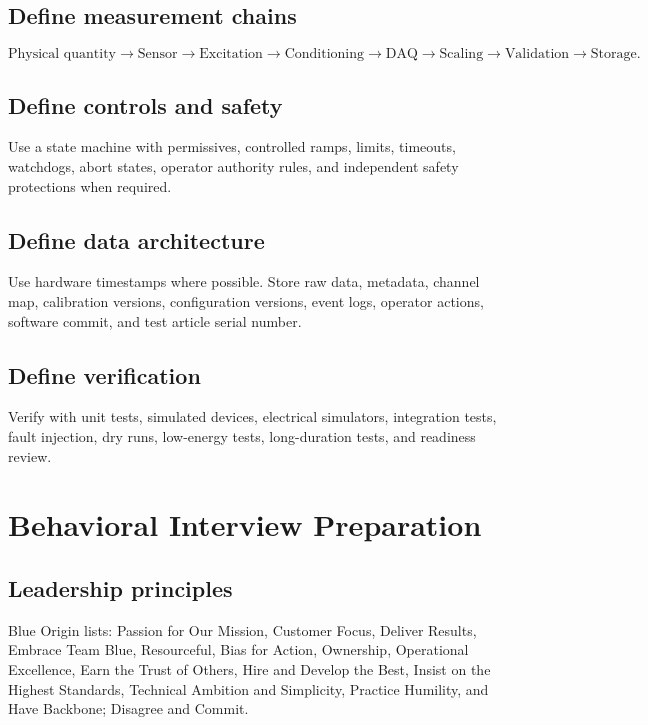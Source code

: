 \documentclass[11pt]{article}
\begin{document}
\subsection{Define measurement chains}
\[
\text{Physical quantity}\rightarrow\text{Sensor}\rightarrow\text{Excitation}
\rightarrow\text{Conditioning}\rightarrow\text{DAQ}\rightarrow
\text{Scaling}\rightarrow\text{Validation}\rightarrow\text{Storage}.
\]

\subsection{Define controls and safety}
Use a state machine with permissives, controlled ramps, limits, timeouts,
watchdogs, abort states, operator authority rules, and independent safety
protections when required.

\subsection{Define data architecture}
Use hardware timestamps where possible. Store raw data, metadata, channel map,
calibration versions, configuration versions, event logs, operator actions,
software commit, and test article serial number.

\subsection{Define verification}
Verify with unit tests, simulated devices, electrical simulators, integration
tests, fault injection, dry runs, low-energy tests, long-duration tests, and
readiness review.

\section{Behavioral Interview Preparation}

\subsection{Leadership principles}
Blue Origin lists: Passion for Our Mission, Customer Focus, Deliver Results,
Embrace Team Blue, Resourceful, Bias for Action, Ownership, Operational
Excellence, Earn the Trust of Others, Hire and Develop the Best, Insist on the
Highest Standards, Technical Ambition and Simplicity, Practice Humility, and
Have Backbone; Disagree and Commit.
\end{document}
